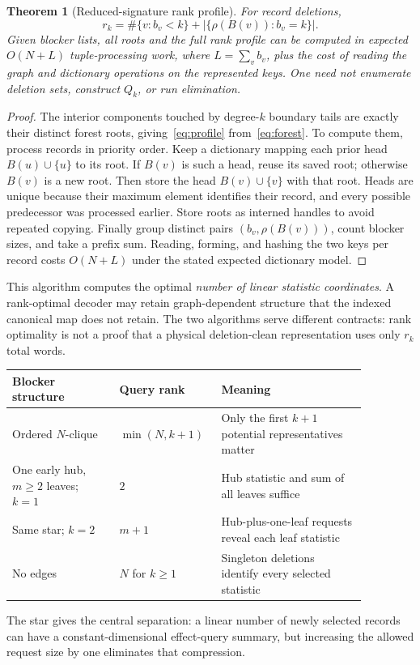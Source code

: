 \documentclass[11pt,a4paper]{article}
\newtheorem{theorem}{Theorem}[section]
\theoremstyle{definition}\newtheorem{definition}[theorem]{Definition}
\begin{document}
\begin{theorem}[Reduced-signature rank profile]\label{thm:profile}
For record deletions,
\begin{equation}\label{eq:profile}
 r_k=\#\{v:b_v<k\}+
       \left|\{\rho(B(v)):b_v=k\}\right|.
\end{equation}
Given blocker lists, all roots and the full rank profile can be computed in expected $O(N+L)$ tuple-processing work, where $L=\sum_v b_v$, plus the cost of reading the graph and dictionary operations on the represented keys. One need not enumerate deletion sets, construct $Q_k$, or run elimination.
\end{theorem}
\begin{proof}
The interior components touched by degree-$k$ boundary tails are exactly their distinct forest roots, giving~\eqref{eq:profile} from~\eqref{eq:forest}. To compute them, process records in priority order. Keep a dictionary mapping each prior head $B(u)\cup\{u\}$ to its root. If $B(v)$ is such a head, reuse its saved root; otherwise $B(v)$ is a new root. Then store the head $B(v)\cup\{v\}$ with that root. Heads are unique because their maximum element identifies their record, and every possible predecessor was processed earlier. Store roots as interned handles to avoid repeated copying. Finally group distinct pairs $(b_v,\rho(B(v)))$, count blocker sizes, and take a prefix sum. Reading, forming, and hashing the two keys per record costs $O(N+L)$ under the stated expected dictionary model.
\end{proof}
This algorithm computes the optimal \emph{number of linear statistic coordinates}. A rank-optimal decoder may retain graph-dependent structure that the indexed canonical map does not retain. The two algorithms serve different contracts: rank optimality is not a proof that a physical deletion-clean representation uses only $r_k$ total words.

\begin{center}\small
\begin{tabular}{p{0.28\linewidth}p{0.21\linewidth}p{0.38\linewidth}}
\toprule
Blocker structure & Query rank & Meaning\\
\midrule
Ordered $N$-clique & $\min(N,k+1)$ & Only the first $k+1$ potential representatives matter\\
One early hub, $m\ge2$ leaves; $k=1$ & $2$ & Hub statistic and sum of all leaves suffice\\
Same star; $k=2$ & $m+1$ & Hub-plus-one-leaf requests reveal each leaf statistic\\
No edges & $N$ for $k\ge1$ & Singleton deletions identify every selected statistic\\
\bottomrule
\end{tabular}
\end{center}
The star gives the central separation: a linear number of newly selected records can have a constant-dimensional effect-query summary, but increasing the allowed request size by one eliminates that compression.
\end{document}
